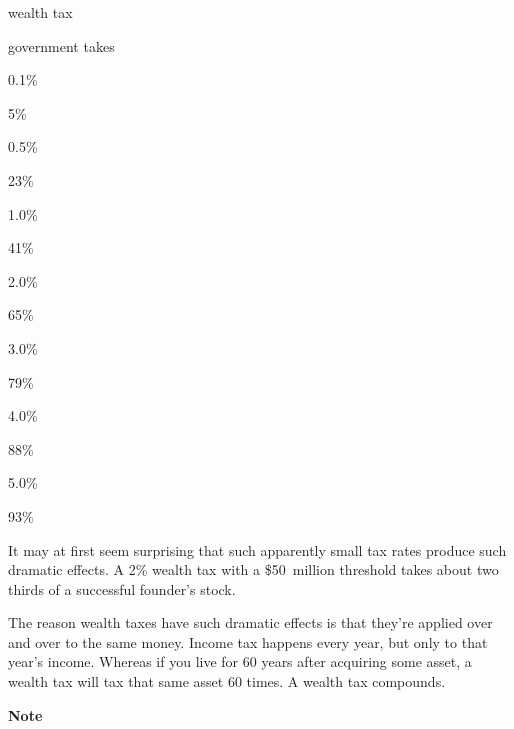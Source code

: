 wealth tax

government takes

0.1\%

5\%

0.5\%

23\%

1.0\%

41\%

2.0\%

65\%

3.0\%

79\%

4.0\%

88\%

5.0\%

93\%

It may at first seem surprising that such apparently small tax rates
produce such dramatic effects. A 2\% wealth tax with a \$50~million
threshold takes about two thirds of a successful founder's stock.

The reason wealth taxes have such dramatic effects is that they're
applied over and over to the same money. Income tax happens every year,
but only to that year's income. Whereas if you live for 60 years after
acquiring some asset, a wealth tax will tax that same asset 60 times. A
wealth tax compounds.

\textbf{Note}